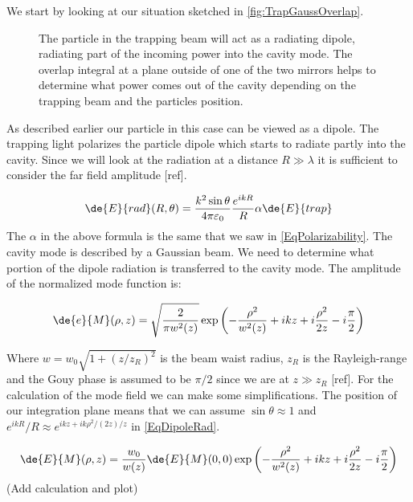 We start by looking at our situation sketched in \autoref{fig:TrapGaussOverlap}.
\begin{figure}[H]
	
	\caption{The particle in the trapping beam will act as a radiating dipole, radiating part of the incoming power into the cavity mode. The overlap integral at a plane outside of one of the two mirrors helps to determine what power comes out of the cavity depending on the trapping beam and the particles position.}
	\label{fig:TrapGaussOverlap}
\end{figure}
As described earlier our particle in this case can be viewed as a dipole. The trapping light polarizes the particle dipole which starts to radiate partly into the cavity. Since we will look at the radiation at a distance $R\gg \lambda$ it is sufficient to consider the far field amplitude [ref].

\begin{equation}\label{EqDipoleRad}
	\de{E}{rad}(R, \theta)=\frac{k^2\sin\theta}{4\pi\varepsilon_0}\frac{e^{ikR}}{R}\alpha \de{E}{trap}
\end{equation}
The $\alpha$ in the above formula is the same that we saw in \autoref{EqPolarizability}. The cavity mode is described by a Gaussian beam. We need to determine what portion of the dipole radiation is transferred to the cavity mode. The amplitude of the normalized mode function is:

\begin{equation}
	\de{e}{M}(\rho, z)=\sqrt{\frac{2}{\pi w^2(z)}}\exp\left(-\frac{\rho^2}{w^2(z)}+ikz+i\frac{\rho^2}{2z}-i\frac{\pi}{2}\right)
\end{equation}

Where $w=w_0\sqrt{1+\left(z/z_R\right)^2}$ is the beam waist radius, $z_R$ is the Rayleigh-range and the Gouy phase is assumed to be $\pi/2$ since we are at $z\gg z_R$ [ref]. For the calculation of the mode field we can make some simplifications. The position of our integration plane means that we can assume $\sin\theta\approx 1$ and $e^{ikR}/R\approx e^{ikz+ik\rho^2/(2z)/z}$ in \autoref{EqDipoleRad}.

\begin{equation}
	\de{E}{M}(\rho, z)=\frac{w_0}{w(z)}\de{E}{M}(0,0)\exp\left(-\frac{\rho^2}{w^2(z)}+ikz+i\frac{\rho^2}{2z}-i\frac{\pi}{2}\right)
\end{equation}
(Add calculation and plot)\\